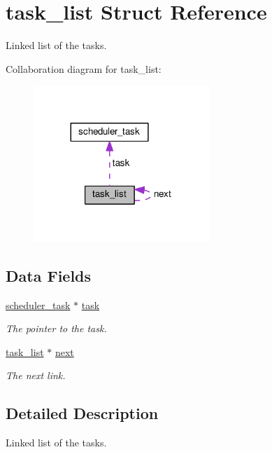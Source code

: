 \hypertarget{structtask__list}{}\section{task\+\_\+list Struct Reference}
\label{structtask__list}


Linked list of the tasks.  




Collaboration diagram for task\+\_\+list\+:\nopagebreak
\begin{figure}[H]
\begin{center}
\leavevmode
\includegraphics[width=188pt]{d0/da8/structtask__list__coll__graph}
\end{center}
\end{figure}
\subsection*{Data Fields}
\begin{DoxyCompactItemize}
\item 
\hyperlink{classscheduler__task}{scheduler\+\_\+task} $\ast$ \hyperlink{structtask__list_a9ff1e9ce16085edc541eca8a6855c2ea}{task}
\begin{DoxyCompactList}\small\item\em The pointer to the task. \end{DoxyCompactList}\item 
\hyperlink{structtask__list}{task\+\_\+list} $\ast$ \hyperlink{structtask__list_a0f53cc75acee38343f59004b332bb37c}{next}
\begin{DoxyCompactList}\small\item\em The next link. \end{DoxyCompactList}\end{DoxyCompactItemize}


\subsection{Detailed Description}
Linked list of the tasks. 

